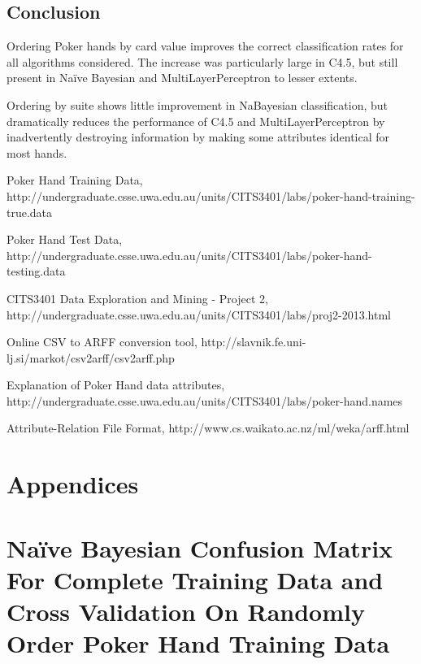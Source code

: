 \documentclass[10pt, a4paper]{article}
\begin{document}
\subsection*{Conclusion}

Ordering Poker hands by card value improves the correct classification rates for all algorithms considered. The increase was particularly large in C4.5, but still present in Na\"ive Bayesian and MultiLayerPerceptron to lesser extents. 

Ordering by suite shows little improvement in Na\ive Bayesian classification, but dramatically reduces the performance of C4.5 and MultiLayerPerceptron by inadvertently destroying information by making some attributes identical for most hands. 

\begin{thebibliography}{9}

	Poker Hand Training Data,	
	http://undergraduate.csse.uwa.edu.au/units/CITS3401/labs/poker-hand-training-true.data
	
	Poker Hand Test Data,	
	http://undergraduate.csse.uwa.edu.au/units/CITS3401/labs/poker-hand-testing.data
	
	CITS3401 Data Exploration and Mining - Project 2,
	http://undergraduate.csse.uwa.edu.au/units/CITS3401/labs/proj2-2013.html

	Online CSV to ARFF conversion tool,
	http://slavnik.fe.uni-lj.si/markot/csv2arff/csv2arff.php

	Explanation of Poker Hand data attributes,
	http://undergraduate.csse.uwa.edu.au/units/CITS3401/labs/poker-hand.names

	Attribute-Relation File Format,
	http://www.cs.waikato.ac.nz/ml/weka/arff.html

\end{thebibliography}



\appendix

\section*{Appendices}

\section{Na\"ive Bayesian Confusion Matrix For Complete Training Data and Cross Validation On Randomly Order Poker Hand Training Data}
\end{document}
